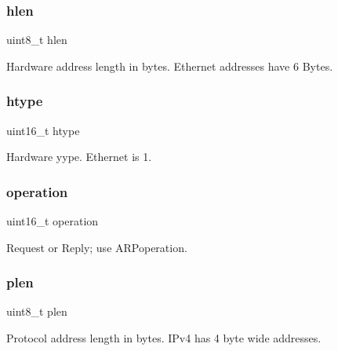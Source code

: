 \subsubsection{\texorpdfstring{hlen}{hlen}}
{\footnotesize\ttfamily uint8\+\_\+t hlen}



Hardware address length in bytes. Ethernet addresses have 6 Bytes. 

\mbox{\label{struct_a_r_p__message_aaf87c38602b614bc7896cf7a5a90d372}} 
\subsubsection{\texorpdfstring{htype}{htype}}
{\footnotesize\ttfamily uint16\+\_\+t htype}



Hardware yype. Ethernet is 1. 

\mbox{\label{struct_a_r_p__message_ad21c763fa2f80cb8649108b759113b54}} 
\subsubsection{\texorpdfstring{operation}{operation}}
{\footnotesize\ttfamily uint16\+\_\+t operation}



Request or Reply; use A\+R\+Poperation. 

\mbox{\label{struct_a_r_p__message_ae414f6c2299d9cf0eff8aa8e81f538d8}} 
\subsubsection{\texorpdfstring{plen}{plen}}
{\footnotesize\ttfamily uint8\+\_\+t plen}



Protocol address length in bytes. I\+Pv4 has 4 byte wide addresses. 

\mbox{\label{struct_a_r_p__message_ab4891e9b77eb26f33d21cfde982564cb}} 
